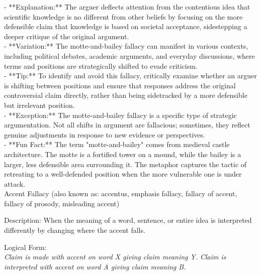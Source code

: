 \documentclass[a4paper,12pt,single,pdftex]{scrbook}
\begin{document}
    
      - **Explanation:** The arguer deflects attention from the contentious idea that scientific knowledge is no different from other beliefs by focusing on the more defensible claim that knowledge is based on societal acceptance, sidestepping a deeper critique of the original argument.
    \\

    
      - **Variation:** The motte-and-bailey fallacy can manifest in various contexts, including political debates, academic arguments, and everyday discussions, where terms and positions are strategically shifted to evade criticism.
    \\

    
      - **Tip:** To identify and avoid this fallacy, critically examine whether an arguer is shifting between positions and ensure that responses address the original controversial claim directly, rather than being sidetracked by a more defensible but irrelevant position.
    \\

    
      - **Exception:** The motte-and-bailey fallacy is a specific type of strategic argumentation. Not all shifts in argument are fallacious; sometimes, they reflect genuine adjustments in response to new evidence or perspectives.
    \\

    
      - **Fun Fact:** The term "motte-and-bailey" comes from medieval castle architecture. The motte is a fortified tower on a mound, while the bailey is a larger, less defensible area surrounding it. The metaphor captures the tactic of retreating to a well-defended position when the more vulnerable one is under attack.
    \\

  

Accent Fallacy
    (also known as: accentus, emphasis fallacy, fallacy of accent, fallacy of prosody, misleading accent)
  
    Description: When the meaning of a word, sentence, or entire idea is interpreted differently by changing where the accent falls. \newline


    
      Logical Form:
    \\

    
      {\em Claim is made with accent on word X giving claim meaning Y.} \newline
{\em Claim is interpreted with accent on word A giving claim meaning B.}
    \\
\end{document}

